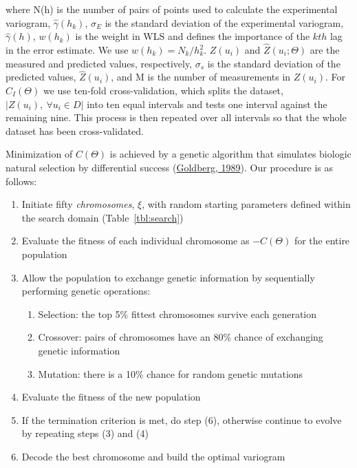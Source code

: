 \documentclass[draft,linenumbers]{agujournal2018}
\begin{document}
where N(h) is the number of pairs of points used to calculate the
experimental variogram, \(\hat{\gamma}(h_k)\), \(\sigma_E\) is the
standard deviation of the experimental variogram, \(\hat{\gamma}(h)\),
\(w(h_k)\) is the weight in WLS and defines the importance of the
\(kth\) lag in the error estimate. We use \(w(h_k) = N_k/h_k^2\).
\(Z(u_i)\) and \(\hat{Z}(u_i; \Theta)\) are the measured and predicted
values, respectively, \(\sigma_s\) is the standard deviation of the
predicted values, \(\hat{Z}(u_i)\), and M is the number of measurements
in \(Z(u_i)\). For \(C_I(\Theta)\) we use ten-fold cross-validation,
which splits the dataset, \(|Z(u_i), ~\forall u_i \in D|\) into ten
equal intervals and tests one interval against the remaining nine. This
process is then repeated over all intervals so that the whole dataset
has been cross-validated.

Minimization of \(C(\Theta)\) is achieved by a genetic algorithm that
simulates biologic natural selection by differential success
(\protect\hyperlink{ref-goldberg1989}{Goldberg, 1989}). Our procedure is
as follows:

\begin{enumerate}
\def\labelenumi{\arabic{enumi}.}
\item
  Initiate fifty \emph{chromosomes}, \(\xi\), with random starting
  parameters defined within the search domain (Table~\ref{tbl:search})
\item
  Evaluate the fitness of each individual chromosome as \(-C(\Theta)\)
  for the entire population
\item
  Allow the population to exchange genetic information by sequentially
  performing genetic operations:

  \begin{enumerate}
  \def\labelenumii{\alph{enumii}.}
  \item
    Selection: the top 5\% fittest chromosomes survive each generation
  \item
    Crossover: pairs of chromosomes have an 80\% chance of exchanging
    genetic information
  \item
    Mutation: there is a 10\% chance for random genetic mutations
  \end{enumerate}
\item
  Evaluate the fitness of the new population
\item
  If the termination criterion is met, do step (6), otherwise continue
  to evolve by repeating steps (3) and (4)
\item
  Decode the best chromosome and build the optimal variogram
\end{enumerate}
\end{document}
